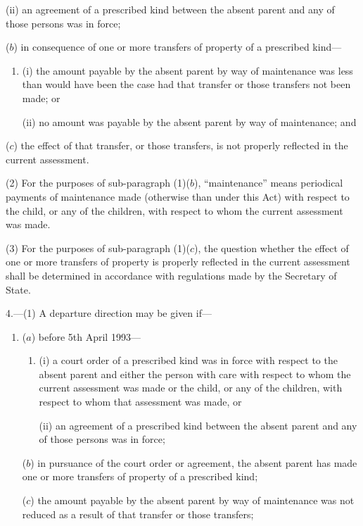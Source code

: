 \documentclass[a4paper]{article}
\begin{document}
{\begin{enumerate}
\begin{enumerate}
(ii) an agreement of a prescribed kind between the absent parent and any of
those persons was in force;
\end{enumerate}

($b$) in consequence of one or more transfers of property of a prescribed kind---
\begin{enumerate}\item[]
(i) the amount payable by the absent parent by way of maintenance was
less than would have been the case had that transfer or those transfers
not been made; or

(ii) no amount was payable by the absent parent by way of maintenance;
and
\end{enumerate}

($c$) the effect of that transfer, or those transfers, is not properly reflected in the
current assessment.
\end{enumerate}

(2)
For the purposes of sub-paragraph (1)($b$), “maintenance” means periodical payments of maintenance made (otherwise than under this Act) with respect to the child, or any of the children, with respect to whom the current assessment was made.

(3)
For the purposes of sub-paragraph (1)($c$), the question whether the effect of one or more transfers of property is properly reflected in the current assessment shall be determined in accordance with regulations made by the Secretary of State.

\medskip

4.—(1) A departure direction may be given if---
\begin{enumerate}\item[]
($a$) before 5th April 1993---
\begin{enumerate}\item[]
(i) a court order of a prescribed kind was in force with respect to the absent parent and either the person with care with respect to whom the current assessment was made or the child, or any of the children, with respect to whom that assessment was made, or

(ii) an agreement of a prescribed kind between the absent parent and any of those persons was in force;
\end{enumerate}

($b$) in pursuance of the court order or agreement, the absent parent has made one or more transfers of property of a prescribed kind;

($c$) the amount payable by the absent parent by way of maintenance was not reduced as a result of that transfer or those transfers;


\end{enumerate}}
\end{document}
